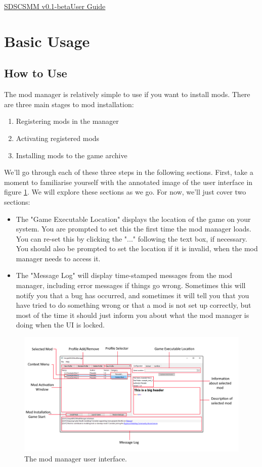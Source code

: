 \documentclass{article}
\newcommand{\cymisversion}{0.1-beta}
\begin{document}
\thispagestyle{empty}
\begin{center}
\huge\underline{SDSCSMM v\cymisversion\space User Guide}
\end{center}
\tableofcontents
\clearpage
{} 
\section{Basic Usage}
\subsection{How to Use}
The mod manager is relatively simple to use if you want to install mods. There are three main stages to mod installation:
\begin{enumerate}
\item Registering mods in the manager
\item Activating registered mods
\item Installing mods to the game archive
\end{enumerate}
We'll go through each of these three steps in the following sections. First, take a moment to familiarise yourself with the annotated image of the user interface in figure \ref{figure:modmanagerui}. We will explore these sections as we go. For now, we'll just cover two sections:
\begin{itemize}
  \item The "Game Executable Location" displays the location of the game on your system. You are prompted to set this the first time the mod manager loads. You can re-set this by clicking the "..." following the text box, if necessary. You should also be prompted to set the location if it is invalid, when the mod manager needs to access it.
  \item The "Message Log" will display time-stamped messages from the mod manager, including error messages if things go wrong. Sometimes this will notify you that a bug has occurred, and sometimes it will tell you that you have tried to do something wrong or that a mod is not set up correctly, but most of the time it should just inform you about what the mod manager is doing when the UI is locked.
\end{itemize}
\begin{figure}[H]\label{figure:modmanagerui}
  \begin{center}
    \includegraphics[scale=0.406]{img/modmanager_ui.png}
  \end{center}
  \caption{The mod manager user interface.}
\end{figure}
\newpage
\end{document}
